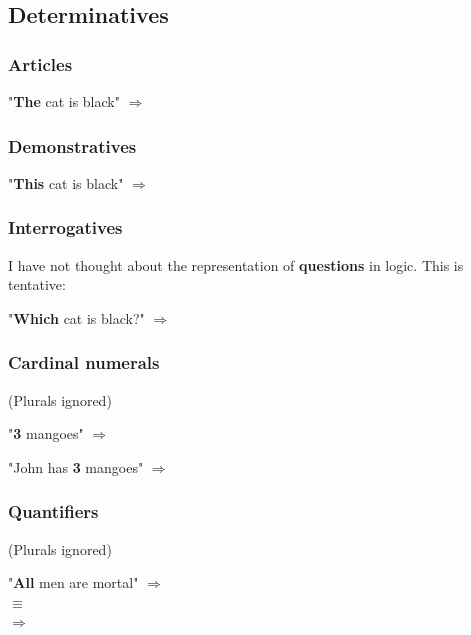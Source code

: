 \subsection{Determinatives}

\subsubsection{Articles}

"\textbf{The} cat is black" $\Longrightarrow$ 

\subsubsection{Demonstratives}

"\textbf{This} cat is black" $\Longrightarrow$ 

\subsubsection{Interrogatives}

I have not thought about the representation of \textbf{questions} in logic.  This is tentative:

"\textbf{Which} cat is black?" $\Longrightarrow$ 

\subsubsection{Cardinal numerals}

(Plurals ignored)

"\textbf{3} mangoes" $\Longrightarrow$ 

"John has \textbf{3} mangoes" $\Longrightarrow$ 

\subsubsection{Quantifiers}

(Plurals ignored)

"\textbf{All} men are mortal" $\Longrightarrow$  \\
\hspace*{1cm} $\equiv$  \\
\hspace*{1cm} $\Longrightarrow$ 

